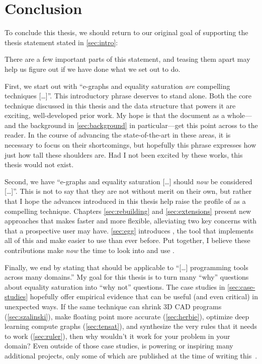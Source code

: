 \chapter{Conclusion}%
\label{sec:conclusion}

To conclude this thesis,
 we should return to our
 original goal of
 supporting the thesis statement
 stated in \autoref{sec:intro}:
\begin{quote}
  \it\Thesisstmt
\end{quote}
There are a few important parts of this statement,
 and teasing them apart
 may help us figure out if
 we have done what we set out to do.

First, we start out with
 ``e-graphs and equality saturation \emph{are} compelling techniques [\ldots]''.
This introductory phrase deserves to stand alone.
Both the core technique discussed in this thesis
 and the data structure that powers it
 are exciting, well-developed prior work.
My hope is that the document as a whole---and the
 background in \autoref{sec:background} in
 particular---get this point across to the reader.
In the course of advancing the state-of-the-art
 in these areas,
 it is necessary to focus on their shortcomings,
 but hopefully this phrase expresses
 how just how tall these shoulders are.
Had I not been excited by these works,
 this thesis would not exist.

Second, we have
 ``e-graphs and equality saturation [\ldots] should \emph{now} be considered [\ldots]''.
This is not to say that they are not without merit on their own,
 but rather that I hope the advances introduced in this thesis
 help raise the profile of \eqsat as a compelling technique.
Chapters \ref{sec:rebuilding} and \ref{sec:extensions}
 present new approaches that makes \eqsat faster and more flexible,
 alleviating two key concerns with that a prospective user may have.
\autoref{sec:egg} introduces \egg,
 the tool that implements all of this
 and make \eqsat easier to use than ever before.
Put together, I believe these contributions make \emph{now}
 the time to look into and use \eqsat.

Finally, we end by stating that \eqsat should be applicable to
 ``[\ldots] programming tools across many domains.''
My goal for this thesis is to turn
 many ``why'' questions about equality saturation into ``why not'' questions.
The case studies in \autoref{sec:case-studies}
 hopefully offer empirical evidence that
 \eqsat can be useful (and even critical)
 in unexpected ways.
If the same technique can shrink 3D CAD programs (\autoref{sec:szalinski}),
 make floating point more accurate (\autoref{sec:herbie}),
 optimize deep learning compute graphs (\autoref{sec:tensat}),
 and synthesize the very rules that it needs to work (\autoref{sec:ruler}),
 then why wouldn't it work for your problem in your domain?
Even outside of those case studies,
 \egg is powering or inspiring many additional projects,
 only some of which are published at the time of writing
 this~\cite{spores, Cheli2021, diospyros}.


